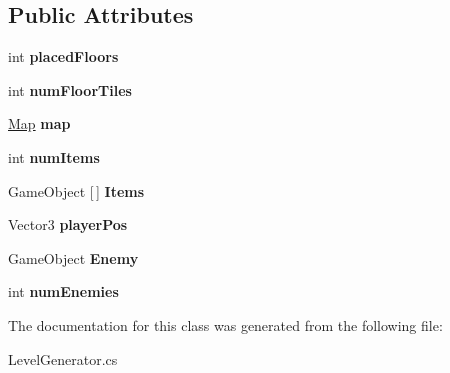 \subsection*{Public Attributes}
\begin{DoxyCompactItemize}
\item 
\mbox{\label{class_completed_1_1_level_generator_a1f495bac99f2520a6cdc7949abd1901a}} 
int {\bfseries placed\+Floors}
\item 
\mbox{\label{class_completed_1_1_level_generator_a4d3a79f611c1f1958372a9fa018fef12}} 
int {\bfseries num\+Floor\+Tiles}
\item 
\mbox{\label{class_completed_1_1_level_generator_a3683acf37342e58917d62bdfb4920605}} 
\mbox{\hyperlink{class_map}{Map}} {\bfseries map}
\item 
\mbox{\label{class_completed_1_1_level_generator_a96a5d7a791a7cace1db5fac4932bd0a3}} 
int {\bfseries num\+Items}
\item 
\mbox{\label{class_completed_1_1_level_generator_a285945bcaa4e52d34b86ffc0c5492d60}} 
Game\+Object \mbox{[}$\,$\mbox{]} {\bfseries Items}
\item 
\mbox{\label{class_completed_1_1_level_generator_ab820dfc29b9b876659a155b7e72dcc15}} 
Vector3 {\bfseries player\+Pos}
\item 
\mbox{\label{class_completed_1_1_level_generator_a45c4fdc5051944c5036fa56e8ad85ae1}} 
Game\+Object {\bfseries Enemy}
\item 
\mbox{\label{class_completed_1_1_level_generator_acb8af6a600d1121e4d1e55c8b827d4ff}} 
int {\bfseries num\+Enemies}
\end{DoxyCompactItemize}


The documentation for this class was generated from the following file\+:\begin{DoxyCompactItemize}
\item 
Level\+Generator.\+cs\end{DoxyCompactItemize}
